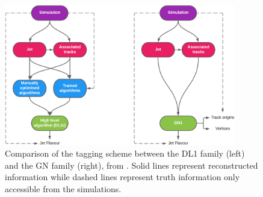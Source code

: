 \begin{figure}[h!]
  \center
  \includegraphics[width=0.9\textwidth]{Images/FTAG/GN/Intro/schematics_difference.png}
  \caption{Comparison of the tagging scheme between the DL1 family (left) and the GN family (right), from \cite{ATL-PHYS-PUB-2022-027}. Solid lines represent reconstructed information while dashed lines represent truth information only accessible from the simulations.} 
  \label{fig:ftagArchi}
\end{figure}

